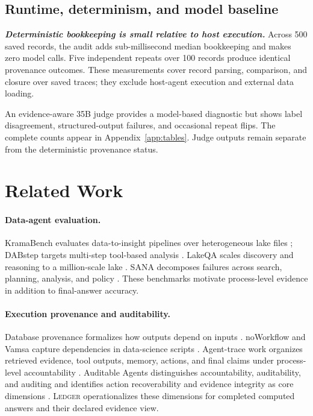 \documentclass[5p,times]{elsarticle}
\newcommand{\ledger}{\textsc{Ledger}\xspace}
\newcommand{\etitle}[1]{%
  \par\vspace{0.35ex}\noindent\textbf{\textit{#1}}\hspace{0.4em}}
\begin{document}
\subsection{Runtime, determinism, and model baseline}\label{sec:runtime}

\etitle{Deterministic bookkeeping is small relative to host execution.}
Across 500 saved records, the audit adds sub-millisecond median bookkeeping and makes zero model calls. Five independent repeats over 100 records produce identical provenance outcomes. These measurements cover record parsing, comparison, and closure over saved traces; they exclude host-agent execution and external data loading.

An evidence-aware 35B judge provides a model-based diagnostic but shows label disagreement, structured-output failures, and occasional repeat flips. The complete counts appear in Appendix~\ref{app:tables}. Judge outputs remain separate from the deterministic provenance status.

\section{Related Work}\label{sec:related}

\paragraph{Data-agent evaluation.}
KramaBench evaluates data-to-insight pipelines over heterogeneous lake files \citep{kramabench2025}; DABstep targets multi-step tool-based analysis \citep{dabstep2025}. LakeQA scales discovery and reasoning to a million-scale lake \citep{lakeqa2026}. SANA decomposes failures across search, planning, analysis, and policy \citep{sana2026}. These benchmarks motivate process-level evidence in addition to final-answer accuracy.

\paragraph{Execution provenance and auditability.}
Database provenance formalizes how outputs depend on inputs \citep{green2007provenance,cheney2009provenance,amsterdamer2011aggregate}. noWorkflow and Vamsa capture dependencies in data-science scripts \citep{murta2014noworkflow,namaki2020vamsa}. Agent-trace work organizes retrieved evidence, tool outputs, memory, actions, and final claims under process-level accountability \citep{agenttrace2026}. Auditable Agents distinguishes accountability, auditability, and auditing and identifies action recoverability and evidence integrity as core dimensions \citep{nian2026auditable}. \ledger operationalizes these dimensions for completed computed answers and their declared evidence view.
\end{document}
